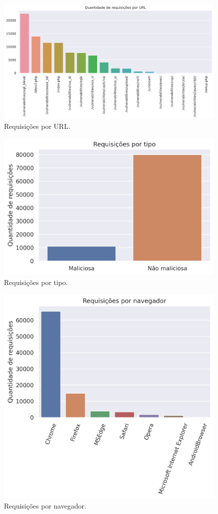 \begin{figure}
    \centering
    \includegraphics[width=.8\textwidth]{figuras/request_por_url.png}
    \caption{Requisições por URL. \label{fig:request_por_url}}    
\end{figure}
\begin{figure}[H]
    \centering
    \includegraphics[width=.7\textwidth]{figuras/request_por_tipo.png}
    \caption{Requisições por tipo. \label{fig:request_por_tipo}}    
\end{figure}
\begin{figure}[H]
    \centering
    \includegraphics[width=.7\textwidth]{figuras/requisicoes_por_navegador.png}
    \caption{Requisições por navegador. \label{fig:request_por_navegador}}    
\end{figure}

